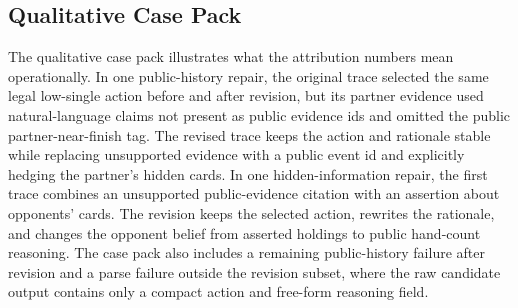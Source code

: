 \documentclass[sigconf,anonymous,review]{acmart}
\begin{document}
\subsection{Qualitative Case Pack}

The qualitative case pack illustrates what the attribution numbers mean operationally. In one public-history repair, the original trace selected the same legal low-single action before and after revision, but its partner evidence used natural-language claims not present as public evidence ids and omitted the public partner-near-finish tag. The revised trace keeps the action and rationale stable while replacing unsupported evidence with a public event id and explicitly hedging the partner's hidden cards. In one hidden-information repair, the first trace combines an unsupported public-evidence citation with an assertion about opponents' cards. The revision keeps the selected action, rewrites the rationale, and changes the opponent belief from asserted holdings to public hand-count reasoning. The case pack also includes a remaining public-history failure after revision and a parse failure outside the revision subset, where the raw candidate output contains only a compact action and free-form reasoning field.
\end{document}
